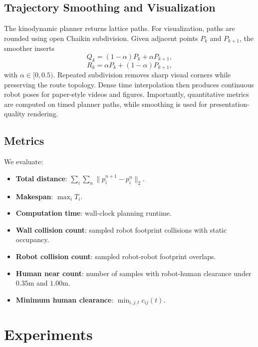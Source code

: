\documentclass[10pt,twocolumn,letterpaper]{article}
\begin{document}
\subsection{Trajectory Smoothing and Visualization}
The kinodynamic planner returns lattice paths. For visualization, paths are rounded using open Chaikin subdivision. Given adjacent points $P_k$ and $P_{k+1}$, the smoother inserts
\begin{equation}
    Q_k = (1-\alpha)P_k + \alpha P_{k+1},
\end{equation}
\begin{equation}
    R_k = \alpha P_k + (1-\alpha)P_{k+1},
\end{equation}
with $\alpha \in [0,0.5)$. Repeated subdivision removes sharp visual corners while preserving the route topology. Dense time interpolation then produces continuous robot poses for paper-style videos and figures. Importantly, quantitative metrics are computed on timed planner paths, while smoothing is used for presentation-quality rendering.

\subsection{Metrics}
We evaluate:
\begin{itemize}
    \item \textbf{Total distance}: $\sum_i \sum_n \|p_i^{n+1}-p_i^n\|_2$.
    \item \textbf{Makespan}: $\max_i T_i$.
    \item \textbf{Computation time}: wall-clock planning runtime.
    \item \textbf{Wall collision count}: sampled robot footprint collisions with static occupancy.
    \item \textbf{Robot collision count}: sampled robot-robot footprint overlaps.
    \item \textbf{Human near count}: number of samples with robot-human clearance under $0.35$m and $1.00$m.
    \item \textbf{Minimum human clearance}: $\min_{i,j,t} c_{ij}(t)$.
\end{itemize}

\section{Experiments}
\end{document}
